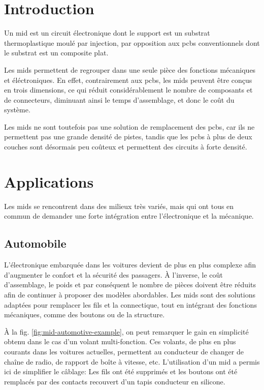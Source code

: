 \section{Introduction}
Un \gls{mid}  est un circuit électronique
dont le support est un substrat thermoplastique moulé par injection, par
opposition aux \glspl{pcb} conventionnels dont le substrat est un composite
plat.

Les \glspl{mid} permettent de regrouper dans une seule pièce des fonctions
mécaniques et éléctroniques. En effet, contrairement aux \glspl{pcb}, les
\glspl{mid} peuvent être conçus en trois dimensions, ce qui réduit
considérablement le nombre de composants et de connecteurs, diminuant ainsi le
temps d'assemblage, et donc le coût du système. 

Les \glspl{mid} ne sont toutefois pas une solution de remplacement des
\glspl{pcb}, car ils ne permettent pas une grande densité de pistes, tandis que
les \glspl{pcb} à plus de deux couches sont désormais peu coûteux et
permettent des circuits à forte densité.


\section{Applications}
Les \glspl{mid} se rencontrent dans des milieux très variés, mais qui ont tous en commun de demander une forte intégration entre l'électronique et la mécanique.

\subsection{Automobile}
L'électronique embarquée dans les voitures devient de plus en plus complexe afin d'augmenter le confort et la sécurité des passagers. 
À l'inverse, le coût d'assemblage, le poids et par conséquent le nombre de pièces doivent être réduits afin de continuer à proposer des modèles abordables.
Les \glspl{mid} sont des solutions adaptées pour remplacer les fils et la connectique, tout en intégrant des fonctions mécaniques, comme des boutons ou de la structure.

À la fig. \ref{fig:mid-automotive-example}, on peut remarquer le gain en simplicité obtenu dans le cas d'un volant multi-fonction.
Ces volants, de plus en plus courants dans les voitures actuelles, permettent au conducteur de changer de chaîne de radio, de rapport de boîte à vitesse, etc.
L'utilisation d'un \gls{mid} a permis ici de simplifier le câblage: Les fils ont été supprimés et les boutons ont été remplacés par des contacts recouvert d'un tapis conducteur en silicone.

